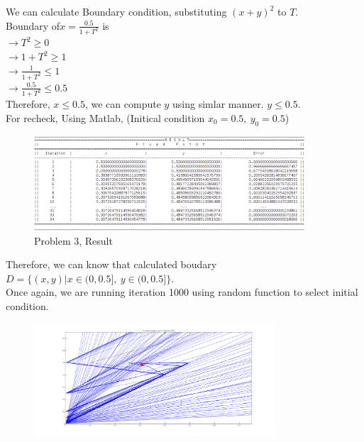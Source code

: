 \documentclass[10pt]{article}
\begin{document}
\begin{flushleft}
	\quad\: We can calculate Boundary condition, substituting $(x+y)^2$ to $T$.\\
	\quad\: Boundary of$x=\frac{0.5}{1+T^2}$ is\\
	\qquad\qquad\qquad\qquad\qquad\qquad\qquad\qquad\qquad $\rightarrow T^2 \geq 0$\\
	\qquad\qquad\qquad\qquad\qquad\qquad\qquad\qquad\qquad $\rightarrow 1+T^2 \geq 1$\\
	\qquad\qquad\qquad\qquad\qquad\qquad\qquad\qquad\qquad $\rightarrow \frac{1}{1+T^2} \leq 1$\\
	\qquad\qquad\qquad\qquad\qquad\qquad\qquad\qquad\qquad $\rightarrow \frac{0.5}{1+T^2} \leq 0.5$\\
	\;\;\;
	\quad\: Therefore, $x \leq 0.5$, we can compute $y$ using simlar manner. $y \leq 0.5$.\\
	\quad\: For recheck, Using Matlab, (Initical condition $x_0=0.5,\:y_0=0.5$)\\
	\begin{figure}[!h]
		\centering
		\begin{center}
		\includegraphics[width=0.9\textwidth]{3-r.png}
		\caption{Problem 3, Result}
		\end{center}
	\end{figure}
	\quad\: Therefore, we can know that calculated boudary $D=\{(x,y)\vert x\in(0,0.5],\:y\in(0,0.5]\}$.\\
	\quad\: Once again, we are running iteration 1000 using random function to select initial condition.\\
	\begin{figure}[!h]
		\centering
		\begin{center}
		\includegraphics[width=0.8\textwidth]{3.png}

\end{center}
\end{figure}
\end{flushleft}
\end{document}
